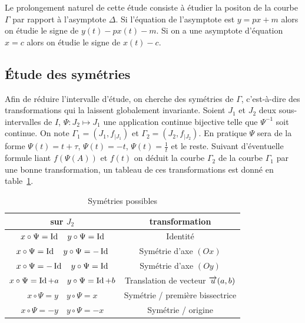 Le prolongement naturel de cette étude consiste à étudier la positon de la 
courbe \(\Gamma\) par rapport à l'asymptote \(\Delta\). Si l'équation de 
l'asymptote est \(y = px + m\) alors on étudie le signe de \(y(t) - px(t) - m\).  
Si on a une asymptote d'équation \(x = c\) alors on étudie le signe de \(x(t) - 
c\).

\subsection{Étude des symétries}
Afin de réduire l'intervalle d'étude, on cherche des symétries de \(\Gamma\), 
c'est-à-dire des transformations qui la laissent globalement invariante. Soient 
\(J_1\) et \(J_2\) deux sous-intervalles de \(I\), \(\Psi:J_2 \longmapsto J_1\) 
une application continue bijective telle que \(\Psi^{-1}\) soit continue. On 
note \(\Gamma_1 = (J_1, f_{|J_1})\) et \(\Gamma_2 = (J_2, f_{|J_2})\). En 
pratique \(\Psi\) sera de la forme \(\Psi(t)=t + \tau\), \(\Psi(t)=-t\), 
\(\Psi(t)=\frac{1}{t}\) et le reste. Suivant d'éventuelle formule liant 
\(f(\Psi(A))\) et \(f(t)\) on déduit la courbe \(\Gamma_2\) de la courbe 
\(\Gamma_1\) par une bonne transformation, un tableau de ces transformations est 
donné en table~\ref{tab:sym}.

\begin{table}
  \centering
  \begin{tabular}{|c|c|} \hline
    sur \( J_2\) & transformation \\ \hline
    \(x \circ \Psi = \operatorname{Id} \quad y \circ \Psi = \operatorname{Id}\) &Identité \\ \hline
    \(x \circ \Psi = \operatorname{Id} \quad y \circ \Psi = -\operatorname{Id}\) &Symétrie d'axe \((Ox)\) \\ 
    \hline
    \(x \circ \Psi = -\operatorname{Id} \quad y \circ \Psi = \operatorname{Id}\) &Symétrie d'axe \((Oy)\) \\ 
    \hline
    \(x \circ \Psi = \operatorname{Id} + a \quad y \circ \Psi = \operatorname{Id} + b\) & Translation de 
    vecteur \(\overrightarrow{u}(a, b)\)\\ \hline
    \(x \circ \Psi = y \quad y \circ \Psi = x\) & Symétrie / première 
    bissectrice\\ \hline
    \(x \circ \Psi = -y \quad y \circ \Psi = -x\) & Symétrie / origine\\ \hline
  \end{tabular}
  \caption{Symétries possibles}
  \label{tab:sym}
\end{table}

